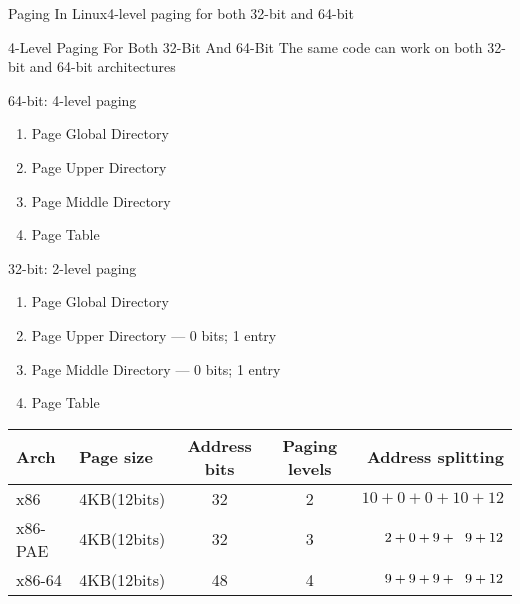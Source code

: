 
\begin{frame}{Paging In Linux}{4-level paging for both 32-bit and 64-bit}
  \centering%
  \mode<beamer>{ \texttt{[image: 4-level-paging]} }%
\end{frame}

\begin{frame}{4-Level Paging For Both 32-Bit And 64-Bit}
  The same code can work on both 32-bit and 64-bit architectures
  \begin{minipage}{.4\linewidth}
    \begin{iblock}{64-bit: 4-level paging}
      \begin{enumerate}
      \item Page Global Directory
      \item Page Upper Directory
      \item Page Middle Directory
      \item Page Table
      \end{enumerate}
    \end{iblock}
  \end{minipage}
  \begin{minipage}{.55\linewidth}
    \begin{iblock}{32-bit: 2-level paging}
      \begin{enumerate}
      \item Page Global Directory
      \item Page Upper Directory --- 0 bits; 1 entry
      \item Page Middle Directory --- 0 bits; 1 entry
      \item Page Table
      \end{enumerate}
    \end{iblock}
  \end{minipage}
  \begin{center}
    \begin{tabular}{llccr}
      \hline
      Arch&Page size&Address bits&Paging levels&Address splitting\\\hline
      x86 &4KB(12bits) &32 &2 &$10+0+0+10+12$\\
      x86-PAE&4KB(12bits)&32&3&$2+0+9+\hspace{.6em}9+12$\\
      x86-64&4KB(12bits)&48&4&$9+9+9+\hspace{.6em}9+12$\\\hline
    \end{tabular}
  \end{center}
\end{frame}

